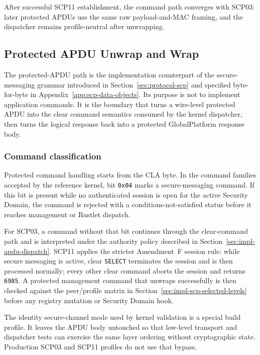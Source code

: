 After successful SCP11 establishment, the command path converges with SCP03:
later protected APDUs use the same raw payload-and-MAC framing, and the
dispatcher remains profile-neutral after unwrapping.

\subsection{Protected APDU Unwrap and Wrap}
\label{sec:impl-scp-ext}

The protected-APDU path is the implementation counterpart of the
secure-messaging grammar introduced in Section~\ref{sec:protocol-scp} and
specified byte-for-byte in Appendix~\ref{app:scp-data-objects}. Its purpose is
not to implement application commands. It is the boundary that turns a
wire-level protected APDU into the clear command semantics consumed by the
kernel dispatcher, then turns the logical response back into a protected
GlobalPlatform response body.

\subsubsection{Command classification}

Protected command handling starts from the CLA byte. In the command families
accepted by the reference kernel, bit \texttt{0x04} marks a
secure-messaging command. If this bit is present while no authenticated session
is open for the active Security Domain, the command is rejected with a
conditions-not-satisfied status before it reaches management or Rustlet
dispatch.

For SCP03, a command without that bit continues through the clear-command path
and is interpreted under the authority policy described in
Section~\ref{sec:impl-apdu-dispatch}. SCP11 applies the stricter Amendment~F
session rule: while secure messaging is active, clear \texttt{SELECT}
terminates the session and is then processed normally; every other clear
command aborts the session and returns \texttt{6985}. A protected management
command that unwraps successfully is then checked against the peer/profile
matrix in Section~\ref{sec:impl-scp-selected-levels} before any registry
mutation or Security Domain hook.

The identity secure-channel mode used by kernel validation is a special build
profile. It leaves the APDU body untouched so that low-level transport and
dispatcher tests can exercise the same layer ordering without cryptographic
state. Production SCP03 and SCP11 profiles do not use that bypass.

